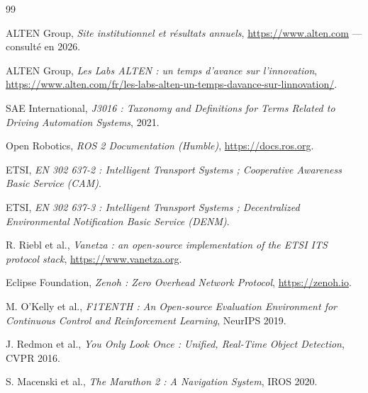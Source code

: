 \begin{thebibliography}{99}

 ALTEN Group, \emph{Site institutionnel et résultats annuels},
\url{https://www.alten.com} --- consulté en 2026.

 ALTEN Group, \emph{Les Labs ALTEN : un temps d'avance sur
l'innovation}, \url{https://www.alten.com/fr/les-labs-alten-un-temps-davance-sur-linnovation/}.

 SAE International, \emph{J3016 : Taxonomy and Definitions for
Terms Related to Driving Automation Systems}, 2021.

 Open Robotics, \emph{ROS 2 Documentation (Humble)},
\url{https://docs.ros.org}.

 ETSI, \emph{EN 302 637-2 : Intelligent Transport Systems ;
Cooperative Awareness Basic Service (CAM)}.

 ETSI, \emph{EN 302 637-3 : Intelligent Transport Systems ;
Decentralized Environmental Notification Basic Service (DENM)}.

 R. Riebl et al., \emph{Vanetza : an open-source
implementation of the ETSI ITS protocol stack},
\url{https://www.vanetza.org}.

 Eclipse Foundation, \emph{Zenoh : Zero Overhead Network
Protocol}, \url{https://zenoh.io}.

 M. O'Kelly et al., \emph{F1TENTH : An Open-source Evaluation
Environment for Continuous Control and Reinforcement Learning}, NeurIPS 2019.

 J. Redmon et al., \emph{You Only Look Once : Unified, Real-Time
Object Detection}, CVPR 2016.

 S. Macenski et al., \emph{The Marathon 2 : A Navigation System},
IROS 2020.

\end{thebibliography}
